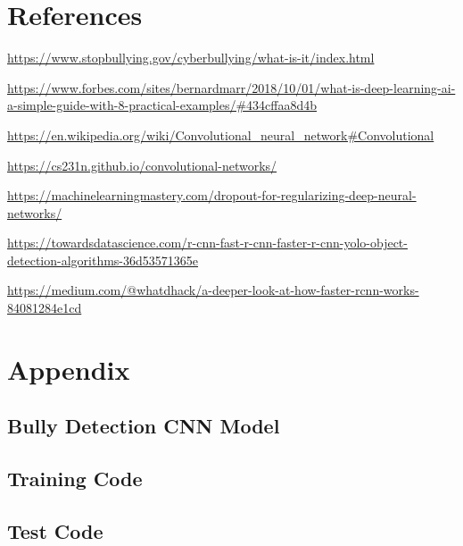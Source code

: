 \documentclass[12pt]{article}
\begin{document}
\section{References}
\begin{enumerate}[label={[\arabic*]}]
\item \url{https://www.stopbullying.gov/cyberbullying/what-is-it/index.html}
\item \url{https://www.forbes.com/sites/bernardmarr/2018/10/01/what-is-deep-learning-ai-a-simple-guide-with-8-practical-examples/#434cffaa8d4b}
\item \url{https://en.wikipedia.org/wiki/Convolutional_neural_network#Convolutional}
\item \url{https://cs231n.github.io/convolutional-networks/}
\item \url{https://machinelearningmastery.com/dropout-for-regularizing-deep-neural-networks/}
\item \url{https://towardsdatascience.com/r-cnn-fast-r-cnn-faster-r-cnn-yolo-object-detection-algorithms-36d53571365e}
\item \url{https://medium.com/@whatdhack/a-deeper-look-at-how-faster-rcnn-works-84081284e1cd}
\end{enumerate}
\newpage

\section{Appendix}
\subsection{Bully Detection CNN Model}

\subsection{Training Code}

\subsection{Test Code}

\end{document}
